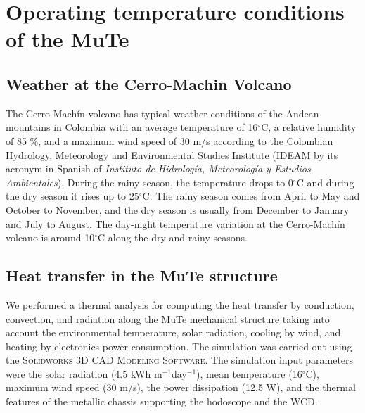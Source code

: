 \documentclass[a4paper,11pt]{article}
\begin{document}


\section{Operating temperature conditions of the MuTe}
\label{sec:obs}

\subsection{Weather at the Cerro-Machin Volcano}

The Cerro-Mach\'in volcano has typical weather conditions of the Andean mountains in Colombia with an average temperature of 16$^{\circ}$C, a relative humidity of 85 $\%$, and a maximum wind speed of 30 m/s according to the Colombian Hydrology, Meteorology and Environmental Studies Institute (IDEAM by its acronym in Spanish of \textit{Instituto de Hidrolog\'ia, Meteorolog\'ia y Estudios Ambientales}). During the rainy season, the temperature drops to 0$^{\circ}$C and during the dry season it rises up to 25$^{\circ}$C. The rainy season comes from April to May and October to November, and the dry season is usually from December to January and July to August. The day-night temperature variation at the Cerro-Mach\'in volcano is around 10$^{\circ}$C along the dry and rainy seasons.

\subsection{Heat transfer in the MuTe structure}

We performed a thermal analysis for computing the heat transfer by conduction, convection, and radiation along the MuTe mechanical structure taking into account the environmental temperature, solar radiation, cooling by wind, and heating by electronics power consumption. The simulation was carried out using the \textsc{Solidworks 3D CAD Modeling Software}. The simulation input parameters were the solar radiation (4.5 kWh m$^{-1}$day$^{-1}$), mean temperature (16$^{\circ}$C), maximum wind speed (30 m/s), the power dissipation (12.5 W), and the thermal features of the metallic chassis supporting the hodoscope and the WCD.
\end{document}
